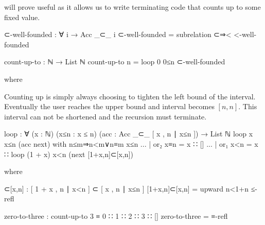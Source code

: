 \documentclass[./Thesis.tex]{subfiles}
\begin{document}
will prove useful as it allows us to write terminating code that counts up to
some fixed value.
\begin{code}
  ⊂-well-founded : ∀ {i} → Acc _⊂_ i
  ⊂-well-founded = subrelation ⊂⇒< <-well-founded

  count-up-to : ℕ → List ℕ
  count-up-to n = loop 0 0≤n ⊂-well-founded
\end{code}
\begin{code}[hide]
    where
\end{code}
Counting up is simply always choosing to tighten the left bound of the interval.
Eventually the user reaches the upper bound and interval becomes $[ n, n ]$.
This interval can not be shortened and the recursion must terminate.
\begin{code}
    loop : ∀ (x : ℕ) (x≤n : x ≤ n) (acc : Acc _⊂_ [ x , n ∣ x≤n ]) → List ℕ
    loop x x≤n (acc next) with n≤m⇒n<m∨n≡m x≤n
    ... | or₂ x≡n = x ∷ []
    ... | or₁ x<n = x ∷ loop (1 + x) x<n (next [1+x,n]⊂[x,n])
\end{code}
\begin{code}[hide]
      where
\end{code}
\begin{code}
      [1+x,n]⊂[x,n] : [ 1 + x , n ∣ x<n ] ⊂ [ x , n ∣ x≤n ]
      [1+x,n]⊂[x,n] = upward n<1+n ≤-refl
\end{code}
\begin{code}
  zero-to-three : count-up-to 3 ≡ 0 ∷ 1 ∷ 2 ∷ 3 ∷ []
  zero-to-three = ≡-refl
\end{code}
\end{document}
